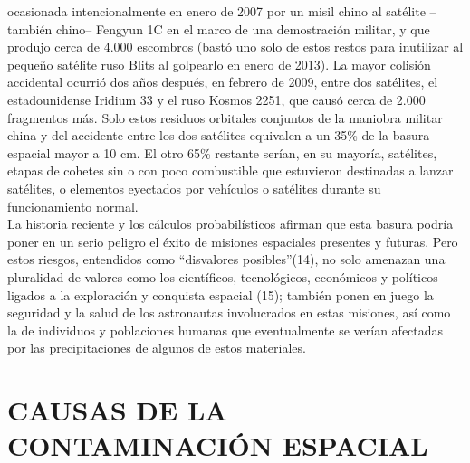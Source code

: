 \documentclass[12pt,letterpaper]{article}
\begin{document}
\begin{multicols}{2}
\noindent ocasionada intencionalmente en enero de 2007 por un misil chino al satélite –también chino– Fengyun 1C en el marco de una demostración militar, y que produjo cerca de 4.000 escombros (bastó uno solo de estos restos para inutilizar al pequeño satélite ruso Blits al golpearlo en enero de 2013). La mayor colisión accidental ocurrió dos años después, en febrero de 2009, entre dos satélites, el estadounidense Iridium 33 y el ruso Kosmos 2251, que causó cerca de 2.000 fragmentos más. Solo estos residuos orbitales conjuntos de la maniobra militar china y del accidente entre los dos satélites equivalen a un 35\% de la basura espacial mayor a 10 cm. El otro 65\% restante serían, en su mayoría, satélites, etapas de cohetes sin o con poco combustible que estuvieron destinadas a lanzar satélites, o elementos eyectados por vehículos o satélites durante su funcionamiento normal.
\\

\noindent La historia reciente y los cálculos probabilísticos afirman que esta basura podría poner en un serio peligro el éxito de misiones espaciales presentes y futuras. Pero estos riesgos, entendidos como “disvalores posibles”(14), no solo amenazan una pluralidad de valores como los científicos, tecnológicos, económicos y políticos ligados a la exploración y conquista espacial (15); también ponen en juego la seguridad y la salud de los astronautas involucrados en estas misiones, así como la de individuos y poblaciones humanas que eventualmente se verían afectadas por las precipitaciones de algunos de estos materiales.
\\

\section*{\noindent \small {CAUSAS DE LA CONTAMINACIÓN ESPACIAL}}
\\


\end{multicols}
\end{document}
